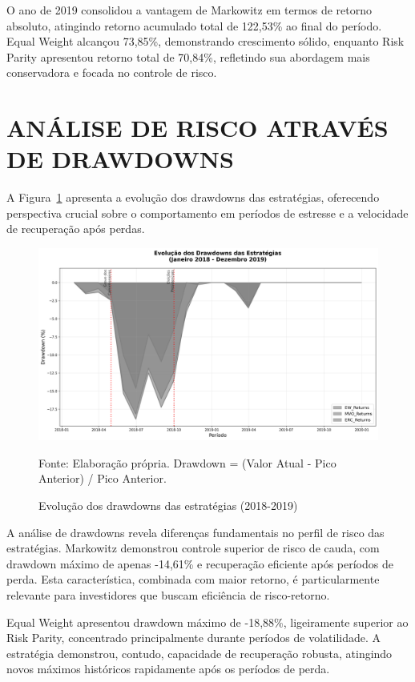 O ano de 2019 consolidou a vantagem de Markowitz em termos de retorno absoluto, atingindo retorno acumulado total de 122,53\% ao final do período. Equal Weight alcançou 73,85\%, demonstrando crescimento sólido, enquanto Risk Parity apresentou retorno total de 70,84\%, refletindo sua abordagem mais conservadora e focada no controle de risco.

\section{ANÁLISE DE RISCO ATRAVÉS DE DRAWDOWNS}

A Figura~\ref{fig:drawdowns} apresenta a evolução dos drawdowns das estratégias, oferecendo perspectiva crucial sobre o comportamento em períodos de estresse e a velocidade de recuperação após perdas.

\begin{figure}[H]
\centering
\includegraphics[width=\textwidth]{figures/drawdowns_essencial.png}
\caption{Evolução dos drawdowns das estratégias (2018-2019)}
\label{fig:drawdowns}
\footnotesize
Fonte: Elaboração própria. Drawdown = (Valor Atual - Pico Anterior) / Pico Anterior.
\end{figure}

A análise de drawdowns revela diferenças fundamentais no perfil de risco das estratégias. Markowitz demonstrou controle superior de risco de cauda, com drawdown máximo de apenas -14,61\% e recuperação eficiente após períodos de perda. Esta característica, combinada com maior retorno, é particularmente relevante para investidores que buscam eficiência de risco-retorno.

Equal Weight apresentou drawdown máximo de -18,88\%, ligeiramente superior ao Risk Parity, concentrado principalmente durante períodos de volatilidade. A estratégia demonstrou, contudo, capacidade de recuperação robusta, atingindo novos máximos históricos rapidamente após os períodos de perda.

